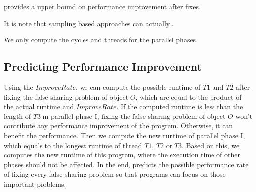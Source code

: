 \cheetah{} provides a upper bound on performance improvement after fixes. 

It is note that sampling based approaches can actually 
.

We only compute the cycles and threads for the parallel phases. 

\subsection{Predicting Performance Improvement}

Using the $ImproveRate$, we can compute the possible runtime of $T1$ and $T2$ after fixing the false sharing problem of object $O$, which are equal to the product of the actual runtime and $ImproveRate$. If the computed runtime is less than the length of $T3$ in parallel phase I, fixing the false sharing problem of object $O$ won't contribute any performance improvement of the program. Otherwise, it can benefit the performance. Then we compute the new runtime of parallel phase I, which equals to the longest runtime of thread $T1$, $T2$ or $T3$. Based on this, we computes the new runtime of this program, where the execution time of other phases should not be affected. In the end, \cheetah{} predicts the possible performance rate of fixing every false sharing problem so that programs can focus on those important problems.






